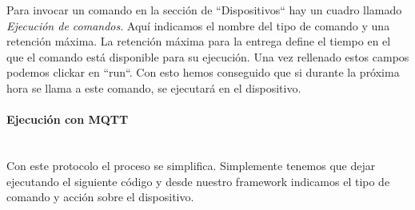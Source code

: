 {Para invocar un comando en la sección de ``Dispositivos`` hay un cuadro llamado \textit{Ejecución de comandos}. Aquí indicamos el nombre del tipo de comando y una retención máxima. La retención máxima para la entrega define el tiempo en el que el comando está disponible para su ejecución. Una vez rellenado estos campos podemos clickar en ``run``. Con esto hemos conseguido que si durante la próxima hora se llama a este comando, se ejecutará en el dispositivo.

\paragraph{Ejecución con MQTT}  \hspace{0pt} \\

Con este protocolo el proceso se simplifica. Simplemente tenemos que dejar ejecutando el siguiente código y desde nuestro framework indicamos el tipo de comando y acción sobre el dispositivo.
}